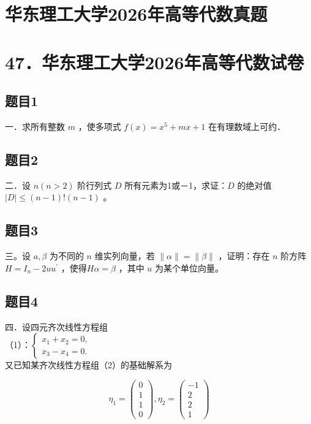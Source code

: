 \documentclass{article}
\begin{document}
\section*{华东理工大学2026年高等代数真题}
\section*{47．华东理工大学2026年高等代数试卷}

\subsection{题目1}
一．求所有整数 \(m\) ，使多项式 \(f(x)=x^{5}+m x+1\) 在有理数域上可约．

\subsection{题目2}
二．设 \(n(n>2)\) 阶行列式 \(D\) 所有元素为1或－1，求证：\(D\) 的绝对值 \(|D| \leq(n-1)!(n-1)\) 。

\subsection{题目3}
三。设 \(a, \beta\) 为不同的 \(n\) 维实列向量，若 \(\|\alpha\|=\|\beta\|\) ，证明：存在 \(n\) 阶方阵 \(H=I_{n}-2 u u^{\prime}\) ，使得\(H \alpha=\beta\) ，其中 \(u\) 为某个单位向量。

\subsection{题目4}
四．设四元齐次线性方程组\\
（1）：\(\left\{\begin{array}{l}x_{1}+x_{2}=0, \\ x_{3}-x_{4}=0 .\end{array}\right.\)\\
又已知某齐次线性方程组（2）的基础解系为

\[
\eta_{1}=\left(\begin{array}{l}
0 \\
1 \\
1 \\
0
\end{array}\right), \eta_{2}=\left(\begin{array}{c}
-1 \\
2 \\
2 \\
1
\end{array}\right)
\]
\end{document}
